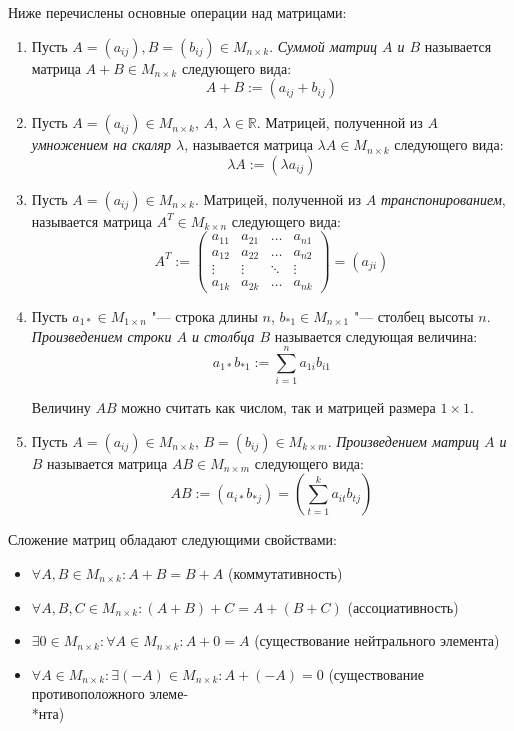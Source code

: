 \begin{definition}
	Ниже перечислены основные операции над матрицами:
	
	\begin{enumerate}
		\item Пусть $A = (a_{ij}), B = (b_{ij}) \in M_{n \times k}$. \textit{Суммой матриц $A$ и $B$} называется матрица $A+B \in M_{n \times k}$ следующего вида:
		\[A + B := (a_{ij} + b_{ij})\]
		
		\item Пусть $A = (a_{ij}) \in M_{n \times k}$, $A$, $\lambda \in \mathbb{R}$.  Матрицей, полученной из $A$ \textit{умножением на скаляр $\lambda$}, называется матрица $\lambda A \in M_{n \times k}$ следующего вида:
		\[\lambda A := (\lambda a_{ij})\]
		
		\item Пусть $A = (a_{ij}) \in M_{n \times k}$. Матрицей, полученной из $A$ \textit{транспонированием}, называется матрица $A^T \in M_{k \times n}$ следующего вида:
		\[A^T := 
		\begin{pmatrix}
		a_{11} & a_{21} & \dots & a_{n1} \\
		a_{12} & a_{22} & \dots & a_{n2} \\
		\vdots & \vdots & \ddots & \vdots \\
		a_{1k} & a_{2k} & \dots & a_{nk}
		\end{pmatrix}
		= (a_{ji})\]
		
		\item Пусть $a_{1*} \in M_{1 \times n}$ "--- строка длины $n$, $b_{*1} \in M_{n \times 1}$ "--- столбец высоты $n$. \textit{Произведением строки $A$ и столбца $B$} называется следующая величина:
		\[a_{1*}b_{*1} := \sum_{i = 1}^{n} a_{1i}b_{i1}\]
		
		Величину $AB$ можно считать как числом, так и матрицей размера $1 \times 1$.
		
		\item Пусть $A = (a_{ij}) \in M_{n \times k}$, $B = (b_{ij}) \in M_{k \times m}$. \textit{Произведением матриц $A$ и $B$} называется матрица $AB \in M_{n \times m}$ следующего вида:
		\[AB := (a_{i*}b_{*j}) = \left(\sum_{t = 1}^{k} a_{it}b_{tj}\right)\]
	\end{enumerate}
\end{definition}

\begin{proposition}
	Сложение матриц обладают следующими свойствами:
	
	\begin{itemize}
		\item $\forall A, B \in M_{n \times k}: A + B = B + A$ (коммутативность)
		\item $\forall A, B, C \in M_{n \times k}: (A + B) + C = A + (B + C)$ (ассоциативность)
		\item $\exists 0 \in M_{n \times k}: \forall A \in M_{n \times k}: A+0 = A$ (существование нейтрального элемента)
		\item $\forall A \in M_{n \times k}: \exists (-A) \in M_{n \times k}: A+(-A) = 0$ (существование противоположного элеме-\\*нта)
	\end{itemize}
\end{proposition}

